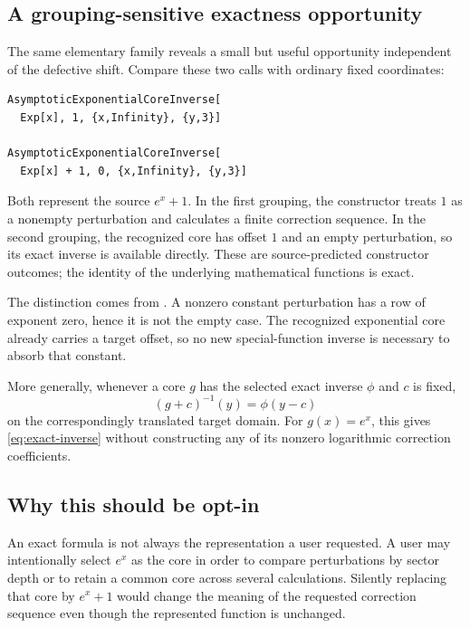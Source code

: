 \documentclass[11pt,letterpaper]{article}
\newcommand{\code}[1]{\texttt{\detokenize{#1}}}
\begin{document}
\subsection{A grouping-sensitive exactness opportunity}
The same elementary family reveals a small but useful opportunity independent of the defective shift. Compare these two calls with ordinary fixed coordinates:
\par\noindent\begin{minipage}{\linewidth}
\begin{lstlisting}
AsymptoticExponentialCoreInverse[
  Exp[x], 1, {x,Infinity}, {y,3}]

AsymptoticExponentialCoreInverse[
  Exp[x] + 1, 0, {x,Infinity}, {y,3}]
\end{lstlisting}
\end{minipage}\par
Both represent the source $e^x+1$. In the first grouping, the constructor treats $1$ as a nonempty perturbation and calculates a finite correction sequence. In the second grouping, the recognized core has offset $1$ and an empty perturbation, so its exact inverse is available directly. These are source-predicted constructor outcomes; the identity of the underlying mathematical functions is exact.\cite{exp-core}

The distinction comes from \code{exact = rows === {}}. A nonzero constant perturbation has a row of exponent zero, hence it is not the empty case. The recognized exponential core already carries a target offset, so no new special-function inverse is necessary to absorb that constant.

More generally, whenever a core $g$ has the selected exact inverse $\phi$ and $c$ is fixed,
\begin{equation}
 (g+c)^{-1}(y)=\phi(y-c)
 \label{eq:constant-absorption}
\end{equation}
on the correspondingly translated target domain. For $g(x)=e^x$, this gives \eqref{eq:exact-inverse} without constructing any of its nonzero logarithmic correction coefficients.

\subsection{Why this should be opt-in}
An exact formula is not always the representation a user requested. A user may intentionally select $e^x$ as the core in order to compare perturbations by sector depth or to retain a common core across several calculations. Silently replacing that core by $e^x+1$ would change the meaning of the requested correction sequence even though the represented function is unchanged.
\end{document}
